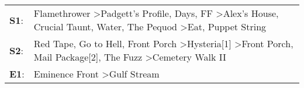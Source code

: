 \begin{supertabular}{p{0.03\textwidth}p{0.92\textwidth}}
 \textbf{S1}:  &  Flamethrower\textsuperscript{} \textgreater \enspace Padgett's Profile\textsuperscript{},  Days\textsuperscript{}, \enspace FF\textsuperscript{} \textgreater \enspace Alex's House\textsuperscript{}, \enspace Crucial Taunt\textsuperscript{}, \enspace Water\textsuperscript{}, \enspace The Pequod\textsuperscript{} \textgreater \enspace Eat\textsuperscript{}, \enspace Puppet String\textsuperscript{}  \enspace  \\
 \textbf{S2}:  &                                                                Red Tape\textsuperscript{}, \enspace Go to Hell\textsuperscript{}, \enspace Front Porch\textsuperscript{} \textgreater \enspace Hysteria[1]\textsuperscript{} \textgreater \enspace Front Porch\textsuperscript{}, \enspace Mail Package[2]\textsuperscript{}, \enspace The Fuzz\textsuperscript{} \textgreater \enspace Cemetery Walk II\textsuperscript{}  \enspace  \\
 \textbf{E1}:  &                                                                                                                                                                                                                                                                                                                                       Eminence Front\textsuperscript{} \textgreater \enspace Gulf Stream\textsuperscript{}  \enspace  \\
\end{supertabular}
